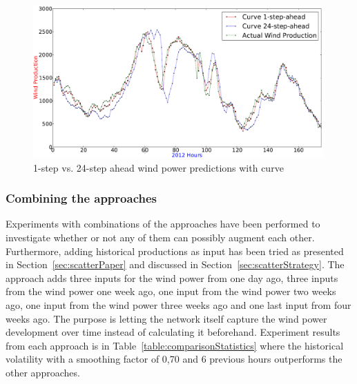 \begin{figure}[H]
\centering
\includegraphics[width=0.99\textwidth]{billeder/curveOneAheadvs24Ahead.png}
\caption{1-step vs. 24-step ahead wind power predictions with curve}
\label{fig:curveOneAheadvs24Ahead}
\end{figure}   

\subsubsection{Combining the approaches}
\label{sec:combiningTheApproachesWP}
Experiments with combinations of the approaches have been performed to investigate whether or not any of them can possibly augment each other. Furthermore, adding historical productions as input has been tried as presented in Section~\ref{sec:scatterPaper} and discussed in Section~\ref{sec:scatterStrategy}. The approach adds three inputs for the wind power from one day ago, three inputs from the wind power one week ago, one input from the wind power two weeks ago, one input from the wind power three weeks ago and one last input from four weeks ago. The purpose is letting the network itself capture the wind power development over time instead of calculating it beforehand. Experiment results from each approach is in Table~\ref{table:comparisonStatistics} where the historical volatility with a smoothing factor of 0,70 and 6 previous hours outperforms the other approaches. 

